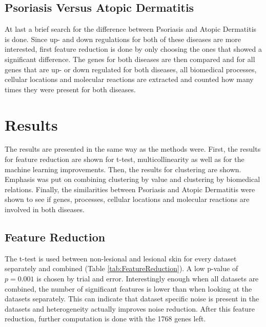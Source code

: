 \documentclass[10pt,a4paper]{article}
\begin{document}
	\subsection{Psoriasis Versus Atopic Dermatitis}
	\label{subsec:MethodsPsoriasisVersusAtopicDermatitis}
	
	At last a brief search for the difference between Psoriasis and Atopic Dermatitis is done. Since up- and down regulations for both of these diseases are more interested, first feature reduction is done by only choosing the ones that showed a significant difference. The genes for both diseases are then compared and for all genes that are up- or down regulated for both diseases, all biomedical processes, cellular locations and molecular reactions are extracted and counted how many times they were present for both diseases. 
	
	\section{Results}
	\label{sec:Results}
	
	The results are presented in the same way as the methods were. First, the results for feature reduction are shown for t-test, multicollinearity as well as for the machine learning improvements. Then, the results for clustering are shown. Emphasis was put on combining clustering by value and clustering by biomedical relations. Finally, the similarities between Psoriasis and Atopic Dermatitis were shown to see if genes, processes, cellular locations and molecular reactions are involved in both diseases. 
	
	
	\subsection{Feature Reduction}
	\label{subsec:ResultsFeatureResuction}
	
	The t-test is used between non-lesional and lesional skin for every dataset separately and combined (Table \ref{tab:FeatureReduction}). A low p-value of $p=0.001$ is chosen by trial and error. Interestingly enough when all datasets are combined, the number of significant features is lower than when looking at the datasets separately. This can indicate that dataset specific noise is present in the datasets and heterogeneity actually improves noise reduction. After this feature reduction, further computation is done with the 1768 genes left.
	
\end{document}
